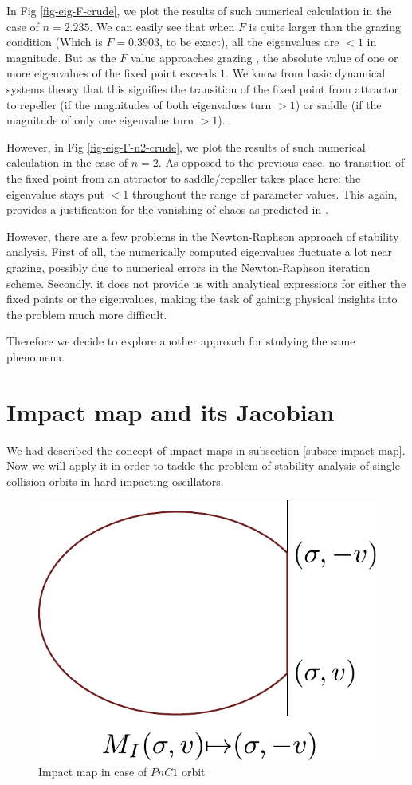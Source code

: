 \documentclass{book}
\renewcommand{\(}{\begin{columns}}
\renewcommand{\)}{\end{columns}}
\newcommand{\<}[1]{\begin{column}{#1}}
\renewcommand{\>}{\end{column}}
\begin{document}
In Fig \ref{fig-eig-F-crude}, we plot the results of such numerical 
calculation in the case of $n=2.235$.  We can easily see that when $F$ is 
quite larger than the grazing condition (Which is $F=0.3903$, to be exact), all the 
eigenvalues are $<1$ in magnitude.  But as the $F$ value 
approaches grazing , the absolute value of one or more eigenvalues of the 
fixed point exceeds $1$.  We know from basic dynamical systems theory that 
this signifies the transition of the fixed point from attractor to repeller 
(if the magnitudes of both eigenvalues turn $>1$) or saddle (if the magnitude 
of only one  eigenvalue turn $>1$). 


However, in Fig \ref{fig-eig-F-n2-crude}, we plot the results of such numerical 
calculation in the case of $n=2$. As opposed to the previous case, no 
transition of the fixed point from an attractor to saddle/repeller takes place 
here: the eigenvalue stays put $<1$ throughout the range of parameter values. 
This again, provides a justification for the vanishing of chaos as predicted 
in \cite{banerjee-kundu-soft} . 

However, there are a few problems in the Newton-Raphson approach of stability 
analysis.  First of all, the numerically computed eigenvalues fluctuate a lot 
near grazing, possibly due to numerical errors in the Newton-Raphson iteration 
scheme.  Secondly, it does not provide us with analytical expressions for 
either the fixed points or the eigenvalues, making the task of gaining 
physical insights into the problem much more difficult.  

Therefore we decide to explore another approach for studying the same 
phenomena.  

\section{Impact map and its Jacobian}
We had described the concept of impact maps in subsection 
\ref{subsec-impact-map}. Now we will apply it in order to tackle the problem of 
stability analysis of single collision orbits in hard impacting oscillators.  

\begin{figure}[!hbp]
\caption{Impact map in case of $PnC1$ orbit}
\label{fig-impmap-dia}
\begin{center}
\includegraphics[width=0.5\columnwidth]{impactmap}
\end{center}
\end{figure}
\end{document}
